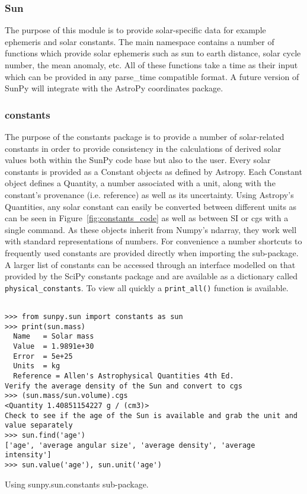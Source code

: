 \subsubsection{Sun}
The purpose of this module is to provide solar-specific data for example ephemeris and
solar constants. The main namespace contains a number of functions which provide solar
ephemeris such as sun to earth distance, solar cycle number, the mean anomaly, etc.
All of these functions take a time as their input which can be provided in any 
parse\_time
compatible format. A future version of SunPy will integrate with the AstroPy coordinates package.


\subsubsection{constants}
The purpose of the constants package is to provide a number of solar-related 
constants in order to provide consistency in the calculations of derived solar 
values both within the SunPy code base but also to the user. Every solar 
constants is provided as a Constant objects as defined by Astropy. Each 
Constant object defines a Quantity, a number associated with a unit, along with 
the constant's provenance (i.e. reference) as well as its uncertainty. Using 
Astropy's Quantities, any solar constant can easily be converted between 
different units as can be seen in Figure~\ref{fig:constants_code} as well
as between SI or cgs with a single command.  As these objects inherit from 
Numpy's ndarray, they work well with standard representations of numbers.
For convenience a number shortcuts to frequently used constants are provided 
directly when importing the sub-package. A larger list of constants can be 
accessed through an interface modelled on that provided by the SciPy constants 
package and are available as a dictionary called \texttt{physical\_constants}. 
To view all quickly a \texttt{print\_all()} function is available.

\begin{listing}[H]
\begin{verbatim}

>>> from sunpy.sun import constants as sun
>>> print(sun.mass)
  Name   = Solar mass
  Value  = 1.9891e+30
  Error  = 5e+25
  Units  = kg
  Reference = Allen's Astrophysical Quantities 4th Ed.
Verify the average density of the Sun and convert to cgs
>>> (sun.mass/sun.volume).cgs
<Quantity 1.40851154227 g / (cm3)>
Check to see if the age of the Sun is available and grab the unit and value separately
>>> sun.find('age')
['age', 'average angular size', 'average density', 'average intensity']
>>> sun.value('age'), sun.unit('age')

\end{verbatim}
\caption{Using sunpy.sun.constants sub-package.}
\label{code:constants_code}
\end{listing}
	